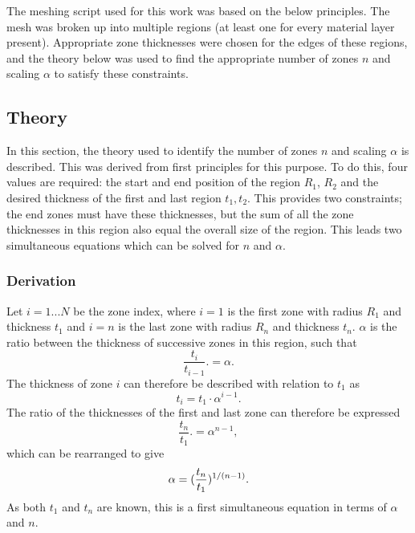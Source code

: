 The meshing script used for this work was based on the below principles. The mesh was broken up into multiple regions (at least one for every material layer present). Appropriate zone thicknesses were chosen for the edges of these regions, and the theory below was used to find the appropriate number of zones $n$ and scaling $\alpha$ to satisfy these constraints.

\subsection{Theory}

In this section, the theory used to identify the number of zones $n$ and scaling $\alpha$ is described. This was derived from first principles for this purpose. To do this, four values are required: the start and end position of the region $R_1$, $R_2$ and the desired thickness of the first and last region $t_1, t_2$. This provides two constraints; the end zones must have these thicknesses, but the sum of all the zone thicknesses in this region also equal the overall size of the region. This leads two simultaneous equations which can be solved for $n$ and $\alpha$.

\subsubsection{Derivation}
Let $i = 1...N$ be the zone index, where $i=1$ is the first zone with radius $R_1$ and thickness $t_1$ and $i=n$ is the last zone with radius $R_n$ and thickness $t_n$. $\alpha$ is the ratio between the thickness of successive zones in this region, such that 
\begin{equation}{\frac{t_{i}}{{t_{i-1}}}. = \alpha.}\end{equation}
The thickness of zone $i$ can therefore be described with relation to $t_1$ as
\begin{equation}{t_i = t_1 \cdot \alpha^{i-1}.}\end{equation}
The ratio of the thicknesses of the first and last zone can therefore be expressed 
\begin{equation}{\frac{t_{n}}{{t_1}}. = \alpha^{n-1},}\end{equation}
which can be rearranged to give
\begin{equation}{\label{eqn: SimEqn1} \alpha = ( \frac{t_{n}}{{t_1}} )^{1/(n-1)}.}\end{equation}
As both $t_1$ and $t_n$ are known, this is a first simultaneous equation in terms of $\alpha$ and $n$.

